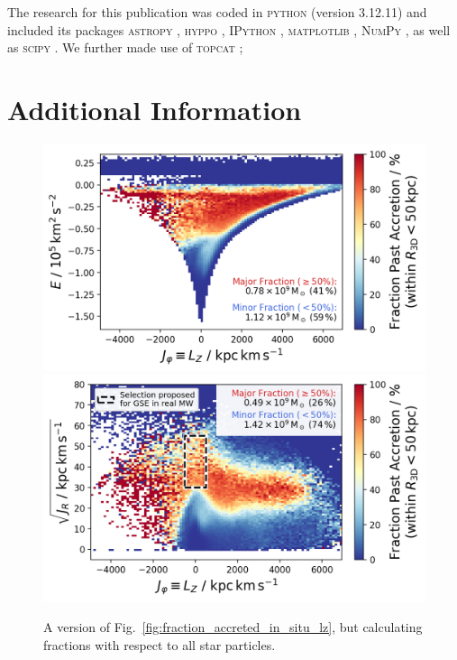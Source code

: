\documentclass[fleqn,usenatbib]{mnras}
\begin{document}
The research for this publication was coded in \textsc{python} (version 3.12.11) and included its packages
\textsc{astropy} \citep[v. 7.1.0;][]{Robitaille2013,PriceWhelan2018},
\textsc{hyppo} \citep[v. 0.5.2;][]{hyppo},
\textsc{IPython} \citep[v. 9.1.0;][]{ipython},
\textsc{matplotlib} \citep[v. 3.10.3;][]{matplotlib},
\textsc{NumPy} \citep[v. 2.2.6;][]{numpy}, as well as
\textsc{scipy} \citep[v. 1.16.0;][]{Scipy}.
We further made use of \textsc{topcat} \citep[version 4.7;][]{Taylor2005};
 



\appendix

\section{Additional Information}

\begin{figure}
    \centering
    \includegraphics[width=\columnwidth]{figures/fraction_accreted_in_situ_lz_e_total.png}
    \includegraphics[width=\columnwidth]{figures/fraction_accreted_in_situ_lz_jr_total.png}
    \caption{A version of Fig.~\ref{fig:fraction_accreted_in_situ_lz}, but calculating fractions with respect to all star particles.}
    \label{fig:fraction_accreted_in_situ_lz_total}
\end{figure}
\end{document}
